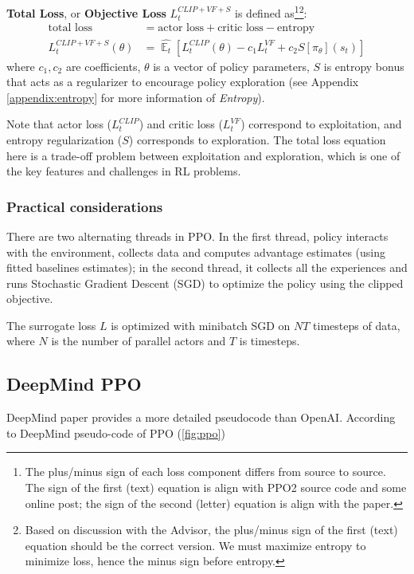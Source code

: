 \documentclass[lang=en,mode=normal,device=normal,color=blue,12pt]{elegantnote}
\DeclareMathOperator*{\E}{\mathbb{E}}
\DeclareMathOperator*{\1}{\mathbbm{1}}
\begin{document}
\textbf{Total Loss}, or \textbf{Objective Loss} $L_t^{CLIP+VF+S}$ is defined as\footnote{The plus/minus sign of each loss component differs from source to source. The sign of the first (text) equation is align with PPO2 source code and some online post; the sign of the second (letter) equation is align with the paper.}\footnote{Based on discussion with the Advisor, the plus/minus sign of the first (text) equation should be the correct version. We must maximize entropy to minimize loss, hence the minus sign before entropy.}:
\begin{align*}
\text{total loss} & = \text{actor loss} + \text{critic loss} - \text{entropy} \\
L_t^{CLIP+VF+S}(\theta) & = \hat{\E_t} [L_t^{CLIP}(\theta) - c_1 L_t^{VF} + c_2 S[\pi_\theta](s_t)]
\end{align*}
where $c_1, c_2$ are coefficients, $\theta$ is a vector of policy parameters, $S$ is entropy bonus that acts as a regularizer to encourage policy exploration (see Appendix \ref{appendix:entropy} for more information of \textit{Entropy}).

Note that actor loss ($L_t^{CLIP}$) and critic loss ($L_t^{VF}$) correspond to exploitation, and entropy regularization ($S$) corresponds to exploration. The total loss equation here is a trade-off problem between exploitation and exploration, which is one of the key features and challenges in RL problems.


\subsubsection{Practical considerations}

There are two alternating threads in PPO. In the first thread, policy interacts with the environment, collects data and computes advantage estimates (using fitted baselines estimates); in the second thread, it collects all the experiences and runs Stochastic Gradient Descent (SGD) to optimize the policy using the clipped objective.

The surrogate loss $L$ is optimized with minibatch SGD on $NT$ timesteps of data, where $N$ is the number of parallel actors and $T$ is timesteps.



\subsection{DeepMind PPO}

DeepMind paper provides a more detailed pseudocode than OpenAI. According to DeepMind pseudo-code of PPO (\ref{fig:ppo})
\end{document}
